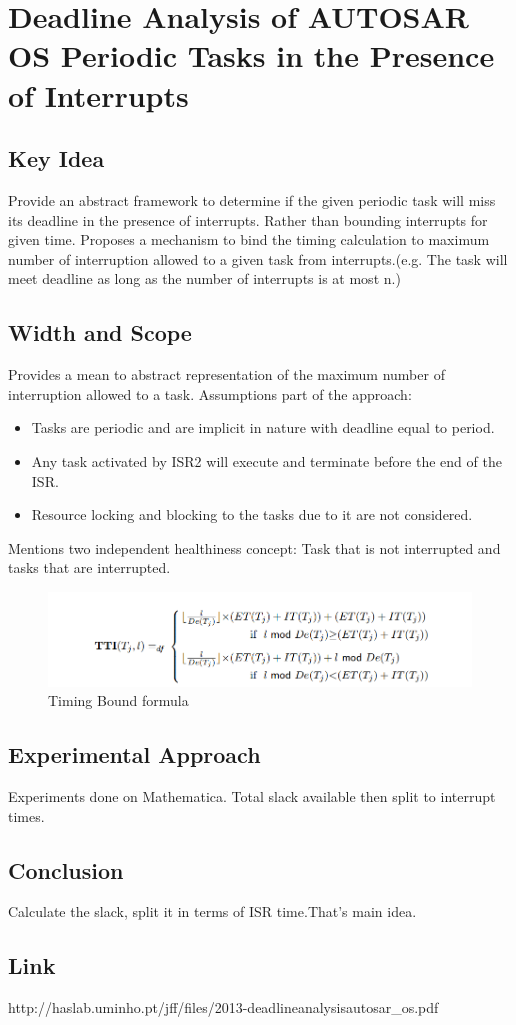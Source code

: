 \section{Deadline Analysis of AUTOSAR OS Periodic Tasks in the Presence of Interrupts}

\subsection{Key Idea}
Provide an abstract framework to determine if the given periodic task will miss its deadline in the presence of interrupts.
Rather than bounding interrupts for given time. Proposes a mechanism to bind the timing calculation to maximum number of interruption allowed to a given task from interrupts.(e.g. The task will meet deadline as long as the number of interrupts is at most n.)
\subsection {Width and Scope}
Provides a mean to abstract representation of the maximum number of interruption allowed to a task.
Assumptions part of the approach:
\begin{itemize}
	\setlength{\itemsep}{0pt}
	\setlength{\parskip}{0pt}
	\setlength{\parsep}{0pt} 
	\item Tasks are periodic and are implicit in nature with deadline equal to period.
	\item Any task activated by ISR2 will execute and terminate before the end of the ISR.
	\item Resource locking and blocking to the tasks due to it are not considered.
\end{itemize}
Mentions two independent healthiness concept: Task that is not interrupted and tasks that are interrupted.
\begin{figure}[H]
	\centering
	\includegraphics[width=400pt]{Pictures/Autosar_TTI_Bound}
	\caption{Timing Bound formula}\label{abs}
\end{figure}
\subsection {Experimental Approach}
Experiments done on Mathematica. Total slack available then split to interrupt times.
\subsection {Conclusion}
Calculate the slack, split it in terms of ISR time.That's main idea.
\subsection {Link}
http://haslab.uminho.pt/jff/files/2013-deadlineanalysisautosar\_os.pdf